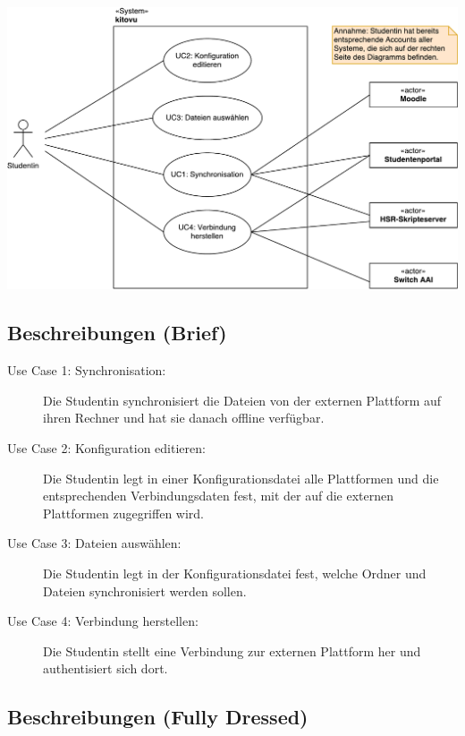 \documentclass[a4paper]{article}
\begin{document}
\includegraphics[width=40em]{./img/uc_diagram_kitovu.pdf}

\subsection{Beschreibungen (Brief)}
\begin{description}
	
\item[Use Case 1: Synchronisation:] Die Studentin synchronisiert die Dateien von der externen Plattform auf ihren Rechner und hat sie danach offline verfügbar.
	
\item[Use Case 2: Konfiguration editieren:] Die Studentin legt in einer Konfigurationsdatei alle Plattformen und die entsprechenden Verbindungsdaten fest, mit der auf die externen Plattformen zugegriffen wird.

\item[Use Case 3: Dateien auswählen:] Die Studentin legt in der Konfigurationsdatei fest, welche Ordner und Dateien synchronisiert werden sollen.

\item[Use Case 4: Verbindung herstellen:] Die Studentin stellt eine Verbindung zur externen Plattform her und authentisiert sich dort.


\end{description}

\pagebreak
\subsection{Beschreibungen (Fully Dressed)}
\end{document}
